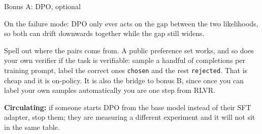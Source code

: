 \documentclass[aspectratio=169,10pt]{beamer}
\begin{document}
\begin{frame}{Bonus A: DPO, optional}
{  On the failure mode: DPO only ever acts on the gap between the two
  likelihoods, so both can drift downwards together while the gap still widens.

  Spell out where the pairs come from. A public preference set works, and so
  does your own verifier if the task is verifiable: sample a handful of
  completions per training prompt, label the correct ones \texttt{chosen} and
  the rest \texttt{rejected}. That is cheap and it is on-policy. It is also the
  bridge to bonus B, since once you can label your own samples automatically
  you are one step from RLVR.

  \textbf{Circulating:} if someone starts DPO from the base model instead of
  their SFT adapter, stop them; they are measuring a different experiment and it
  will not sit in the same table.}
\end{frame}
\end{document}
